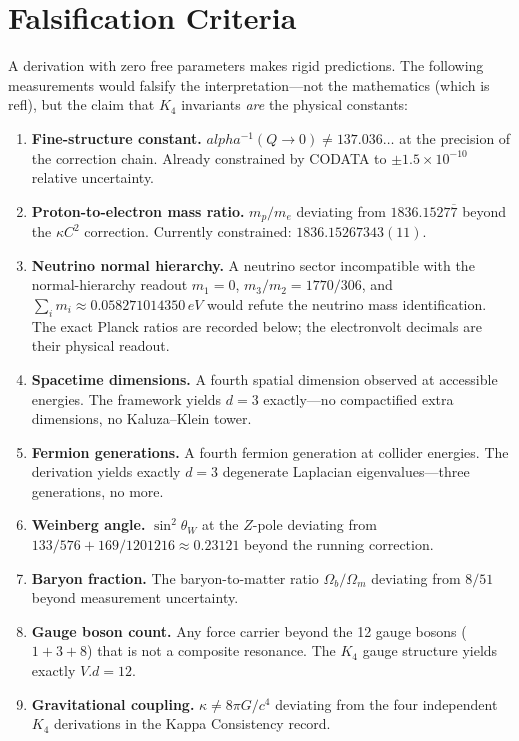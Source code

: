 \documentclass[11pt,a4paper]{book}
\def\alpha{alpha}%
\def\cdot{.}%
\def\mathrm#1{#1}%
\def\texttt#1{#1}%
\begin{document}
\section*{Falsification Criteria}

A derivation with zero free parameters makes rigid predictions. The following measurements would falsify the interpretation---not the mathematics (which is \texttt{refl}), but the claim that $K_4$ invariants \emph{are} the physical constants:

\begin{enumerate}
\item \textbf{Fine-structure constant.} $\alpha^{-1}(Q \to 0) \ne 137.036\ldots$ at the precision of the correction chain. Already constrained by CODATA to $\pm 1.5 \times 10^{-10}$ relative uncertainty.
\item \textbf{Proton-to-electron mass ratio.} $m_p/m_e$ deviating from $1836.1527\overline{7}$ beyond the $\kappa C^2$ correction. Currently constrained: $1836.15267343(11)$.
\item \textbf{Neutrino normal hierarchy.} A neutrino sector incompatible with
  the normal-hierarchy readout $m_1=0$, $m_3/m_2=1770/306$, and
  $\sum_i m_i\approx0.058271014350\,\mathrm{eV}$ would refute the
  neutrino mass identification.  The exact Planck ratios are recorded below;
  the electronvolt decimals are their physical readout.
\item \textbf{Spacetime dimensions.} A fourth spatial dimension observed at accessible energies. The framework yields $d = 3$ exactly---no compactified extra dimensions, no Kaluza--Klein tower.
\item \textbf{Fermion generations.} A fourth fermion generation at collider energies. The derivation yields exactly $d = 3$ degenerate Laplacian eigenvalues---three generations, no more.
\item \textbf{Weinberg angle.} $\sin^2\!\theta_W$ at the $Z$-pole deviating from $133/576 + 169/1201216 \approx 0.23121$ beyond the running correction.
\item \textbf{Baryon fraction.} The baryon-to-matter ratio $\Omega_b / \Omega_m$ deviating from $8/51$ beyond measurement uncertainty.
\item \textbf{Gauge boson count.} Any force carrier beyond the 12 gauge bosons ($1 + 3 + 8$) that is not a composite resonance. The $K_4$ gauge structure yields exactly $V \cdot d = 12$.
\item \textbf{Gravitational coupling.} $\kappa \ne 8\pi G / c^4$ deviating from the four independent $K_4$ derivations in the Kappa Consistency record.
\end{enumerate}
\end{document}
